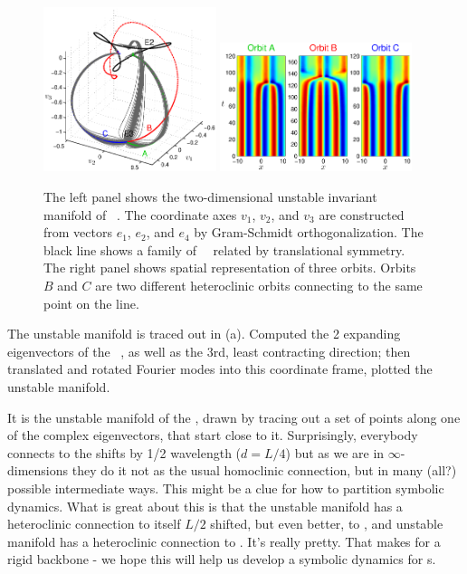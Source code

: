 \begin{figure}[t]
\begin{center} 
\includegraphics[width=0.45\textwidth]{figs/ks22_E3_manifold.eps}
\includegraphics[width=0.5\textwidth]{figs/ks22_E3_orbits.eps}
\end{center}
\caption{
The left panel shows the two-dimensional
unstable invariant manifold of \eqv\ . The coordinate axes
$v_1$, $v_2$, and $v_3$ are constructed from vectors
$e_1$, $e_2$, and $e_4$ by Gram-Schmidt orthogonalization.
The black line shows a family of ~\eqva\ related by translational
symmetry.
The right panel shows spatial representation of
three orbits. Orbits $B$ and $C$ are two different heteroclinic orbits
connecting  to the same point on the  line.
        }
\label{f:KS22E2man1}
\end{figure}



The unstable manifold is traced out in
(a). Computed the 2 expanding eigenvectors
of the \eqv~, as well as the 3rd, least contracting
direction; then translated and rotated Fourier modes into this
coordinate frame, plotted the unstable manifold.

 It is the unstable manifold of the 
{\eqv}, drawn by tracing out a set of points along one of the complex
eigenvectors, that start close to it. Surprisingly, everybody connects
to the  shifts by 1/2 wavelength ($d = L/4$) but as we are in
$\infty$-dimensions they do it not as the usual homoclinic connection, but in
many (all?) possible intermediate ways. This might be a clue for how to
partition symbolic dynamics. 
What is great about
this is that the  unstable manifold has a heteroclinic connection to itself
$L/2$ shifted, but
even better, to , and  unstable manifold has a heteroclinic
connection to .
It's really pretty. That makes for a rigid backbone -
we hope this will help us develop a symbolic dynamics for \rpo s.

